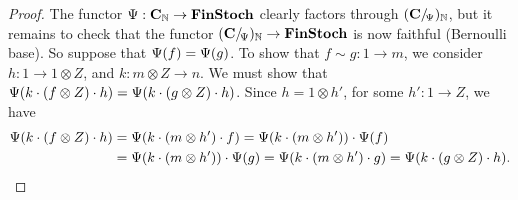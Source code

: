 \begin{proof}
  The functor $\Psi:\mathbf{C}_{\mathbb{N}}\to \mathbf{FinStoch}$ clearly factors through $(\mathbf{C}/\!_\Psi)_{\mathbb{N}}$,
  but it remains to check that the functor $(\mathbf{C}/\!_\Psi)_{\mathbb{N}}\to \mathbf{FinStoch}$ is now
  faithful (Bernoulli base). 
  So suppose that $\Psi(f)=\Psi(g)$. To show that $f\sim g :1\to
  m$, 
  we consider $h:1\to 1\otimes Z$, and $k:m\otimes Z\to n$.
  We must show that $\Psi(k\cdot (f\otimes Z)\cdot h)=\Psi(k\cdot (g\otimes Z)\cdot
  h)$.
  Since $h=1\otimes h'$, for some $h':1\to Z$,
  we have
  \begin{align*}
    \Psi(k\cdot (f\otimes Z)\cdot h)&=\Psi(k\cdot(m\otimes h')\cdot f)
    =
    \Psi(k\cdot(m\otimes h'))\cdot \Psi(f)\\
    &=
    \Psi(k\cdot(m\otimes h'))\cdot \Psi(g)
    =
    \Psi(k\cdot(m\otimes h')\cdot g)
    =
    \Psi(k\cdot (g\otimes Z)\cdot h)\text.\end{align*}
\end{proof}




